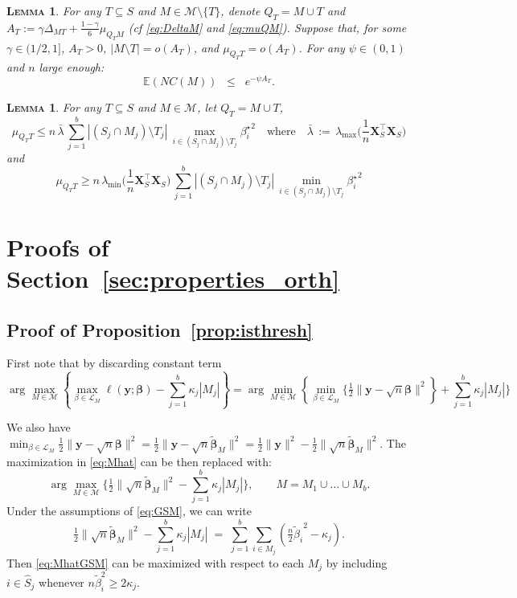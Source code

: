 \documentclass[aos]{imsart}
\theoremstyle{plain}
\newtheorem{lem}[thm]{\textsc{Lemma}}
\newcommand{\E}{\mathbb{E}}
\newcommand{\M}{\mathcal{M}}
\newcommand{\bs}{\boldsymbol}
\begin{document}
\begin{lem}\label{lem:boundexpnc} For any $T\subseteq S$ and $M\in \M\setminus\{T\}$, denote $Q_T= M\cup T$ and $A_T:=\gamma\Delta_{MT}+\tfrac{1-\gamma}{6}\mu_{Q_TM}$ (cf \eqref{eq:DeltaM} and \eqref{eq:muQM}). Suppose that, for some $\gamma \in (1/2,1]$, $A_T>0$, $|M\setminus T|=o(A_T)$, and $\mu_{Q_T T}=o(A_T)$. For any $\psi\in(0,1)$ and $n$ large enough:
$$\E\left(NC(M)\right)  \;\;\leq\;\; e^{-\psi A_T}.$$
\end{lem}

\begin{lem}\label{lem:upperboundnoncentralgen}
    For any $T\subseteq S$ and $M\in \M$, let $Q_T=M\cup T$, $$\mu_{Q_TT} \leq n\,\bar{\lambda}\,\sum_{j=1}^b|(S_j\cap M_j )\setminus T_j|\,\max_{i\in (S_j\cap M_j )\setminus T_j}{\beta_{i}^{\star}}^2 \quad \text{where}\quad \bar{\lambda}\,:=\,\lambda_{\max}\Big(\frac1n \bs X_{S}^\top\bs X_{S}\Big)$$
    and
    $$\mu_{Q_TT} \geq n\,\lambda_{\min}\Big(\frac1n \bs X_{S}^\top\bs X_{S}\Big)\,\sum_{j=1}^b|(S_j\cap M_j )\setminus T_j|\,\min_{i\in (S_j\cap M_j )\setminus T_j}{\beta_{i}^{\star}}^2$$
\end{lem}

\section{Proofs of Section~\ref{sec:properties_orth}}
 
 

\subsection{Proof of Proposition~\ref{prop:isthresh}}
First note that by discarding constant term 
 $$\arg\max_{M\in \M} \left\{\max_{\beta\in \mathcal{L}_M}\ell(\bs y; \bs \beta)-\sum_{j=1}^b\kappa_j |M_j| \right\}=\arg\min_{M\in \M} \left\{\min_{\beta\in \mathcal{L}_M}\bigg\{ \tfrac{1}{2}\|\bs y-\sqrt{n}\bs\beta\|^2\right\}+\sum_{j=1}^b\kappa_j |M_j| \bigg\}$$

 We also have $\min_{\beta\in \mathcal{L}_M} \tfrac{1}{2}\|\bs y-\sqrt{n}\bs\beta\|^2=\tfrac{1}{2}\|\bs y-\sqrt{n}\tilde{\bs \beta}_M\|^2=\tfrac{1}{2}\|\bs y\|^2-\tfrac{1}{2}\|\sqrt{n}\tilde{\bs \beta}_M\|^2$. The maximization in \eqref{eq:Mhat} can be then replaced with:
     \begin{equation}\label{eq:MhatGSM}
  \arg\max_{M\in \M} \bigg\{\tfrac{1}{2}\| \sqrt{n}\tilde{\bs \beta}_M\|^2-\sum_{j=1}^b\kappa_j |M_j|\bigg\}, \qquad M=M_1\cup \ldots\cup M_b.	
\end{equation}
Under the assumptions of \eqref{eq:GSM}, we can write 
	$$
	\tfrac{1}{2}\|\sqrt{n}\tilde{\bs \beta}_M\|^2-\sum_{j=1}^b\kappa_j |M_j|\;=\;\sum_{j=1}^b\sum_{i\in M_j}(\tfrac{n}{2}{\tilde{ \beta}_i}^2-\kappa_j).
	$$
	Then \eqref{eq:MhatGSM} can be maximized with respect to each $M_j$ by including $i\in \hat S_j$ whenever $n\tilde\beta_i^2\geq 2\kappa_j$.
\end{document}
